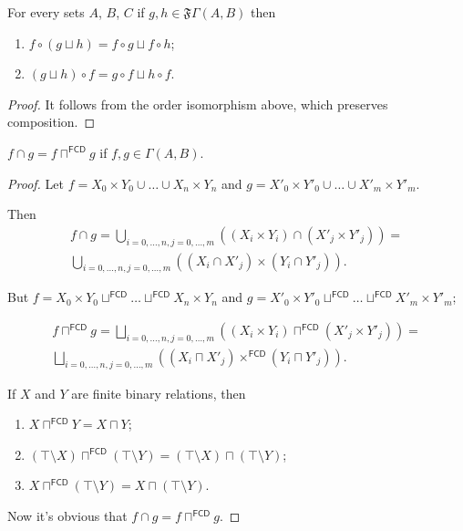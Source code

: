 \begin{thm}
For every sets $A$, $B$, $C$ if $g,h\in\mathfrak{F}\Gamma(A,B)$
then
\begin{enumerate}
\item $f\circ(g\sqcup h)=f\circ g\sqcup f\circ h$;
\item $(g\sqcup h)\circ f=g\circ f\sqcup h\circ f$.
\end{enumerate}
\end{thm}
\begin{proof}
It follows from the order isomorphism above, which preserves composition.\end{proof}
\begin{thm}
$f\cap g=f\sqcap^{\mathsf{FCD}}g$ if $f,g\in\Gamma(A,B)$.\end{thm}
\begin{proof}
Let $f=X_{0}\times Y_{0}\cup\ldots\cup X_{n}\times Y_{n}$ and $g=X'_{0}\times Y'_{0}\cup\ldots\cup X'_{m}\times Y'_{m}$.

Then 
\begin{multline*}
f\cap g=\bigcup_{i=0,\ldots,n,j=0,\ldots,m}((X_{i}\times Y_{i})\cap(X'_{j}\times Y'_{j}))=\\
\bigcup_{i=0,\ldots,n,j=0,\ldots,m}((X_{i}\cap X'_{j})\times(Y_{i}\cap Y'_{j})).
\end{multline*}


But $f=X_{0}\times Y_{0}\sqcup^{\mathsf{FCD}}\ldots\sqcup^{\mathsf{FCD}}X_{n}\times Y_{n}$
and $g=X'_{0}\times Y'_{0}\sqcup^{\mathsf{FCD}}\ldots\sqcup^{\mathsf{FCD}}X'_{m}\times Y'_{m}$;

\begin{multline*}
f\sqcap^{\mathsf{FCD}}g=\bigsqcup_{i=0,\ldots,n,j=0,\ldots,m}((X_{i}\times Y_{i})\sqcap^{\mathsf{FCD}}(X'_{j}\times Y'_{j}))=\\
\bigsqcup_{i=0,\ldots,n,j=0,\ldots,m}((X_{i}\sqcap X'_{j})\times^{\mathsf{FCD}}(Y_{i}\sqcap Y'_{j})).
\end{multline*}

\begin{cor}
If $X$ and $Y$ are finite binary relations, then
\begin{enumerate}
  \item $X \sqcap^{\mathsf{FCD}} Y = X \sqcap Y$;
  \item $(\top \setminus X) \sqcap^{\mathsf{FCD}} (\top \setminus Y) =
  (\top \setminus X) \sqcap (\top \setminus Y)$;
  \item $X \sqcap^{\mathsf{FCD}} (\top \setminus Y) = X \sqcap (\top
  \setminus Y)$.
\end{enumerate}
\end{cor}

Now it's obvious that $f\cap g=f\sqcap^{\mathsf{FCD}}g$.\end{proof}
